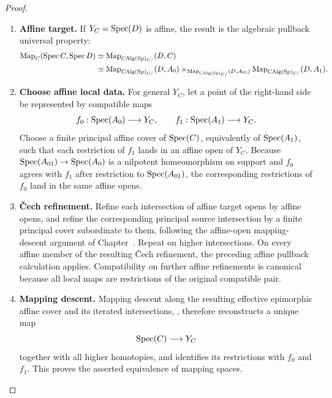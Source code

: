 \begin{proof}
\begin{enumerate}[label=\textup{(\arabic*)}]
    The pullback algebra \(C=A_0\times_{A_{01}}A_1\) is connective by
    , and its degree-zero homotopy ring is
    \[
        \pi_0(C)
        \simeq
        \pi_0(A_0)\times_{\pi_0(A_{01})}\pi_0(A_1).
    \]
    The projection \(\pi_0(C)\to\pi_0(A_1)\) is surjective, and its kernel
    identifies with \(J\) through the first projection. In particular that
    kernel is nilpotent. Consequently
    \[
        \Spec(A_1)\longrightarrow\Spec(C)
    \]
    is also a nilpotent closed immersion and a homeomorphism on underlying
    topological spaces. This conclusion is obtained from the algebraic
    pullback; no geometric Cartesian identification of the displayed affine
    square is being asserted.
    \item \textbf{Affine target.}
    If \(Y_C=\operatorname{Spec}(D)\) is affine, the result is the algebraic pullback universal
    property:
    \[
    \begin{aligned}
        \operatorname{Map}_C(\operatorname{Spec} C,\operatorname{Spec} D)
        &\simeq
        \operatorname{Map}_{\operatorname{CAlg}(\operatorname{Sp})_{C/}}(D,C)
        \\
        &\simeq
        \operatorname{Map}_{\operatorname{CAlg}(\operatorname{Sp})_{C/}}(D,A_0)
        \times_{\operatorname{Map}_{\operatorname{CAlg}(\operatorname{Sp})_{C/}}(D,A_{01})}
        \operatorname{Map}_{\operatorname{CAlg}(\operatorname{Sp})_{C/}}(D,A_1).
    \end{aligned}
    \]
    \item \textbf{Choose affine local data.}
    For general \(Y_C\), let a point of the right-hand side be represented by
    compatible maps
    \[
        f_0:\operatorname{Spec}(A_0)\longrightarrow Y_C,
        \qquad
        f_1:\operatorname{Spec}(A_1)\longrightarrow Y_C.
    \]
    Choose a finite principal affine cover of \(\operatorname{Spec}(C)\), equivalently of
    \(\operatorname{Spec}(A_1)\), such that each restriction of \(f_1\) lands in an affine open
    of \(Y_C\). Because
    \(\operatorname{Spec}(A_{01})\to\operatorname{Spec}(A_0)\) is a nilpotent homeomorphism on support and
    \(f_0\) agrees with \(f_1\) after restriction to \(\operatorname{Spec}(A_{01})\), the
    corresponding restrictions of \(f_0\) land in the same affine opens.
    \item \textbf{Čech refinement.}
    Refine each intersection of affine target opens by affine opens, and refine
    the corresponding principal source intersection by a finite principal cover
    subordinate to them, following the affine-open mapping-descent argument of
    Chapter~.
    Repeat on higher intersections. On every affine member of the resulting
    Čech refinement, the preceding affine pullback calculation applies.
    Compatibility on further affine refinements is canonical because all local
    maps are restrictions of the original compatible pair.
    \item \textbf{Mapping descent.}
    Mapping descent along the resulting effective epimorphic affine cover and its
    iterated intersections,
    , therefore reconstructs a
    unique map
    \[
        \operatorname{Spec}(C)\longrightarrow Y_C
    \]
    together with all higher homotopies, and identifies its restrictions with
    \(f_0\) and \(f_1\). This proves the asserted equivalence of mapping spaces.
\end{enumerate}
\end{proof}

